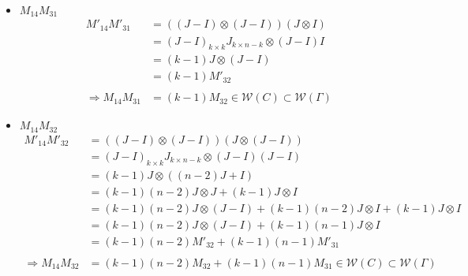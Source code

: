 \documentclass{article}
\begin{document}
\begin{itemize}
\begin{itemize}
\begin{itemize}
            \item $M_{14}M_{31}$ \\
            \begin{align*}
                M'_{14}M'_{31}
                &= ((J-I)\otimes (J-I))(J\otimes I) \\
                &= (J-I)_{k\times k}J_{k\times n-k}\otimes (J-I)I \\
                &= (k-1)J\otimes (J-I)\\
                &= (k-1)M'_{32} \\ \\
                \Rightarrow M_{14}M_{31} &= (k-1)M_{32} \in \mathcal{W}(C) \subset \mathcal{W}(\Gamma)
            \end{align*}

            \item $M_{14}M_{32}$ \\
            \begin{align*}
                M'_{14}M'_{32}
                &= ((J-I)\otimes (J-I))(J\otimes (J-I)) \\
                &= (J-I)_{k\times k}J_{k\times n-k}\otimes (J-I)(J-I) \\
                &= (k-1)J\otimes ((n-2)J+I)\\
                &= (k-1)(n-2)J\otimes J + (k-1)J\otimes I \\
                &= (k-1)(n-2)J\otimes (J-I) + (k-1)(n-2)J\otimes I + (k-1)J\otimes I\\
                &= (k-1)(n-2)J\otimes (J-I) + (k-1)(n-1)J\otimes I \\
                &= (k-1)(n-2)M'_{32} + (k-1)(n-1)M'_{31} \\ \\
                \Rightarrow M_{14}M_{32} &= (k-1)(n-2)M_{32} + (k-1)(n-1)M_{31} \in \mathcal{W}(C) \subset \mathcal{W}(\Gamma)
            \end{align*}
        \end{itemize}
        

\end{itemize}
\end{itemize}
\end{document}
